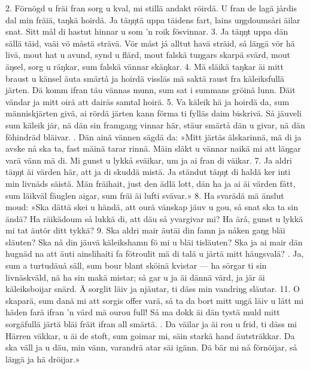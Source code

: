 \setlength{\columnsep}{0cm}
\begin{multicols}{2}
2.  Förnögd u fräi fran sorg u kval,
    mi stillä andakt röirdä.
    U fran de lagä jårdis dal
    min fräiä, taŋkä hoirdä.
    Ja täŋŋtä uppa täidens fart,
    lains uŋgdoumsåri äilar snat.
    Sitt mål di hastut hinnar
    u som ’n roik fösvinnar.
3.  Ja täŋŋt uppa dän sällä täid,
    vaäi vö måstä strävä.
    Vör måst jå alltut havä sträid,
    så läŋgä vör hä livä,
    mout hat u avund, synd u flärd,
    mout falskä tuŋgars skarpä svärd,
    mout äŋsel, sorg u räŋkar,
    sum falskä vännar skäŋkar.
4.  Mä släikä taŋkar äi mitt braust
    u känsel äuta smärtå
    ja hoirdä vissläs mä saktä raust
    fra käleiksfullä järten.
    Dä komm ifran täu vännas munn,
    sum sat i summans gröinä lunn.
    Däit vändar ja mitt oirä
    att dairäs samtal hoirä.
5.  Va käleik hä ja hoirdä da,
    sum människjärten givä,
    ai rördä järten kann förma
    ti fylläs daim biskrivä.
    Så jäuveli sum käleik jär,
    nä dän sin framgaŋg vinnar här,
    stäur smärtå dän u givar,
    nä dän föhindräd bläivar.
\vfill{}.  Dän ainä vännen sägdä da:
    »Mitt järtäs älskarinnä,
    mä di ja avske nå ska ta,
    fast mäinä tarar rinnä.
    Mäin släkt u vännar naikä mi
    att läŋgar varä vänn mä di.
    Mi gunst u lykkå sväikar,
    um ja ai fran di väikar.
7.  Ja aldri täŋŋt äi värden här,
    att ja di skuddä mistä.
    Ja ständut täŋŋt di haldä ker
    inti min livnäds säistä.
    Män fräihait, just den ädlä lott,
    dän ha ja ai äi värden fått,
    sum läikväl fäuglen aigar,
    sum fräi äi lufti svävar.»
8.  Ha svarädä mä änslut moud:
    »Ska dättä skei u händä,
    att ourä vänskap jäuv u gou,
    så snat ska ta sin ändä?
    Ha räikädoum så lukkä di,
    att däu så yvargivar mi?
    Ha ärå, gunst u lykkä
    mi tat äutör ditt tykkä?
9.  Ska aldri mair äutäi din famn
    ja nåken gaŋg bläi släuten?
    Ska nå din jäuvä käleikshamn
    fö mi u bläi tisläuten?
    Ska ja ai mair dän hugnäd na
    att äuti ainslihaiti fa
    fötroulit mä di talä
    u järtä mitt häugsvalä?
\vfill{}. Ja, sum a turtudäuå säll,
    sum bour blant sköinä kvistar —
    ha sörgar ti sin livnäskväld,
    nä ha sin makä mistar;
    så gar u ja äi dännä värd,
    ja jär äi käleiksboijar snärd.
    Ä sorglit läiv ja njäutar,
    ti däss min vandriŋg släutar.
11. O skaparä, sum danä mi
    att sorgis offer varä,
    så ta da bort mitt uŋgä läiv
    u lätt mi häden farä
    ifran ’n värd mä ourou full!
    Så ma dokk äi dän tystä muld
    mitt sorgäfullä järtä
    bläi fräit ifran all smärtä.
\vfill{}. Da väilar ja äi rou u frid,
    ti däss mi Härren väkkar,
    u äi de stoft, sum goimar mi,
    säin starkä hand äutsträkkar.
    Da ska väll ja u däu, min vänn,
    varandrä atar säi igänn.
    Dä bär mi nå förnöijar,
    så läŋgä ja hä dröijar.»
\end{multicols}
